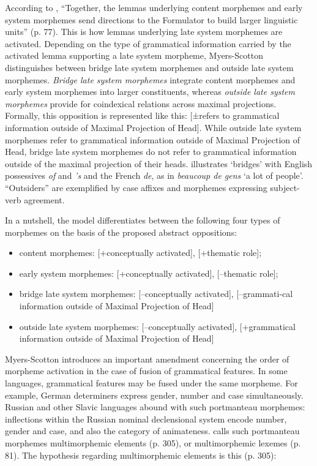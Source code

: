 According to \citet{myers-scotton-contact-2002}, ``Together, the lemmas underlying content morphemes and early system morphemes send directions to the Formulator to build larger linguistic units'' (p. 77). This is how lemmas underlying late system morphemes are activated. Depending on the type of grammatical information carried by the activated lemma supporting a late system morpheme, Myers-Scotton distinguishes between bridge late system morphemes and outside late system morphemes. \textit{Bridge late system morphemes} integrate content morphemes and early system morphemes into larger constituents, whereas \textit{outside late system morphemes} provide for coindexical relations across maximal projections. Formally, this opposition is represented like this: [±refers to grammatical information outside of Maximal Projection of Head]. While outside late system morphemes refer to grammatical information outside of Maximal Projection of Head, bridge late system morphemes do not refer to grammatical information outside of the maximal projection of their heads. \citet[75]{myers-scotton-contact-2002} illustrates `bridges' with English possessives \textit{of} and \textit{'s} and the French \textit{de}, as in \textit{beaucoup de gens} `a lot of people'. ``Outsiders'' are exemplified by case affixes and morphemes expressing subject-verb agreement.

In a nutshell, the model differentiates between the following four types of morphemes on the basis of the proposed abstract oppositions:
\begin{itemize} 
\item content morphemes: [+conceptually activated], [+thematic role];
\item early system morphemes: [+conceptually activated], [--thematic role];
\item bridge late system morphemes: [--conceptually activated], [--grammati-cal information outside of Maximal Projection of Head]
\item outside late system morphemes: [--conceptually activated], [+grammatical information outside of Maximal Projection of Head]
\end{itemize}

Myers-Scotton introduces an important amendment concerning the order of morpheme activation in the case of fusion of grammatical features. In some languages, grammatical features may be fused under the same morpheme. For example, German determiners express gender, number and case simultaneously. Russian and other Slavic languages abound with such portmanteau morphemes: inflections within the Russian nominal declensional system encode number, gender and case, and also the category of animateness. \citet[][]{myers-scotton-contact-2002} calls such portmanteau morphemes multimorphemic elements (p. 305), or multimorphemic lexemes (p. 81). The hypothesis regarding multimorphemic elements is this (p. 305): %

